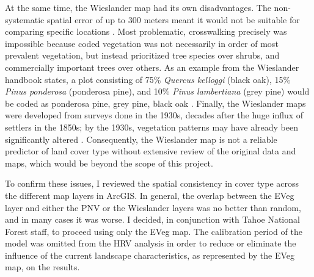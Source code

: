 At the same time, the Wieslander map had its own disadvantages. The non-systematic spatial error of up to 300 meters meant it would not be suitable for comparing specific locations \citep{Thorne2006}. Most problematic, crosswalking precisely was impossible because coded vegetation was not necessarily in order of most prevalent vegetation, but instead prioritized tree species over shrubs, and commercially important trees over others. As an example from the Wieslander handbook states, a plot consisting of 75\% \emph{Quercus kelloggi} (black oak), 15\% \emph{Pinus ponderosa} (ponderosa pine), and 10\% \emph{Pinus lambertiana} (grey pine) would be coded as ponderosa pine, grey pine, black oak \citep{Thorne2006}. Finally, the Wieslander maps were developed from surveys done in the 1930s, decades after the huge influx of settlers in the 1850s; by the 1930s, vegetation patterns may have already been significantly altered \citep{Thorne2006}. Consequently, the Wieslander map is  not a reliable predictor of land cover type without extensive review of the original data and maps, which would be beyond the scope of this project. 

To confirm these issues, I reviewed the spatial consistency in cover type across the different map layers in ArcGIS. In general, the overlap between the EVeg layer and either the PNV or the Wieslander layers was no better than random, and in many cases it was worse. I decided, in conjunction with Tahoe National Forest staff, to proceed using only the EVeg map. The calibration period of the model was omitted from the HRV analysis in order to reduce or eliminate the influence of the current landscape characteristics, as represented by the EVeg map, on the results.





